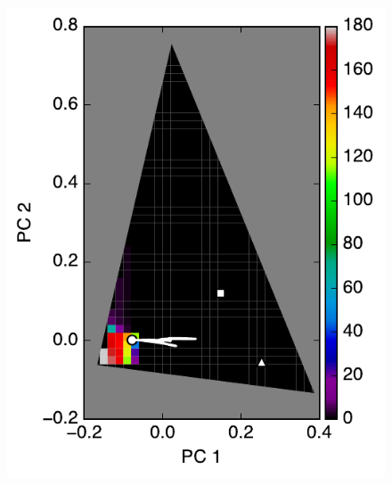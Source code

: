 \documentclass[iop,numberedappendix,apj,]{emulateapj}
\begin{document}
\begin{figure}[tbh!]
   \begin{minipage}{0.33\hsize}
    \begin{center}
	\includegraphics[width=\hsize]{mockdata_90deg_3types_t360_lc_noreg_0.pdf}
    \end{center}	
   \end{minipage}
   \begin{minipage}{0.33\hsize}
    \begin{center}

\end{center}
\end{minipage}
\end{figure}
\end{document}
